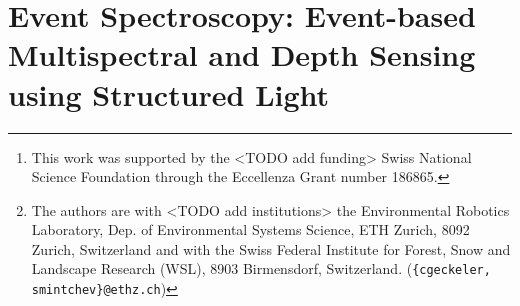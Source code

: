 \chapter[Event Spectroscopy]{Event Spectroscopy: Event-based Multispectral and Depth Sensing using Structured Light}
\label{ch:ED}





\author{Manasi~Muglikar, Niklas~Neugebauer, Christian~Geckeler, Davide Scaramuzza, and Stefano~Mintchev%
\thanks{This work was supported by the <TODO add funding> Swiss National Science Foundation through the Eccellenza Grant number 186865.}%
\thanks{The authors are with <TODO add institutions> the Environmental Robotics Laboratory, Dep. of Environmental Systems Science, ETH Zurich, 8092 Zurich, Switzerland and with the Swiss Federal Institute for Forest, Snow and Landscape Research (WSL), 8903 Birmensdorf, Switzerland. ({\tt\footnotesize \{cgeckeler, smintchev\}@ethz.ch})}%
}








